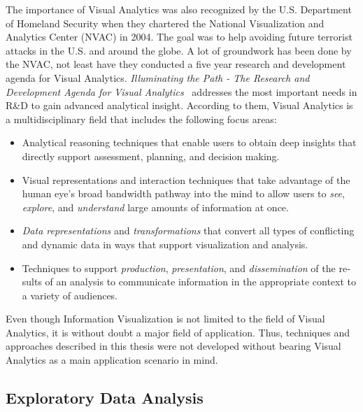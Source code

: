 \begin{english}
The importance of Visual Analytics was also recognized by the U.S. Department of Homeland Security when they chartered the National Visualization and Analytics Center (NVAC) in 2004. The goal was to help avoiding future terrorist attacks in the U.S. and around the globe. A lot of groundwork has been done by the NVAC, not least have they conducted a five year research and development agenda for Visual Analytics. \emph{Illuminating the Path - The Research and Development Agenda for Visual Analytics}~\cite{IlluminatingThePath05} addresses the most important needs in R\&D to gain advanced analytical insight. According to them, Visual Analytics is a multidisciplinary field that includes the following focus areas:

\begin{itemize}
\item Analytical reasoning techniques that enable users to obtain deep insights that directly support assessment, planning, and decision making.
\item Visual representations and interaction techniques that take advantage of the human eye's broad bandwidth pathway into the mind to allow users to \emph{see}, \emph{explore}, and \emph{understand} large amounts of information at once.
\item \emph{Data representations} and \emph{transformations} that convert all types of conflicting and dynamic data in ways that support visualization and analysis.
\item Techniques to support \emph{production}, \emph{presentation}, and \emph{dissemination} of the results of an analysis to communicate information in the appropriate context to a variety of audiences.
\end{itemize}

\SuperPar Even though Information Visualization is not limited to the field of Visual Analytics, it is without doubt a major field of application. Thus, techniques and approaches described in this thesis were not developed without bearing Visual Analytics as a main application scenario in mind.


\subsection{Exploratory Data Analysis}



\end{english}
